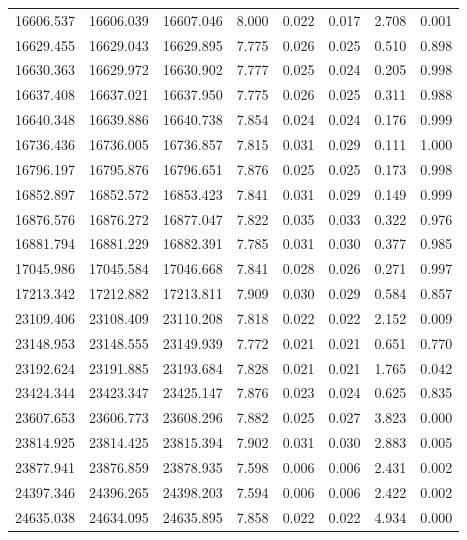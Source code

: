 \begin{table}
\begin{tabular}{cccccccc}
16606.537 & 16606.039 & 16607.046 & 8.000 & 0.022 & 0.017 & 2.708 & 0.001 \\
16629.455 & 16629.043 & 16629.895 & 7.775 & 0.026 & 0.025 & 0.510 & 0.898 \\
16630.363 & 16629.972 & 16630.902 & 7.777 & 0.025 & 0.024 & 0.205 & 0.998 \\
16637.408 & 16637.021 & 16637.950 & 7.775 & 0.026 & 0.025 & 0.311 & 0.988 \\
16640.348 & 16639.886 & 16640.738 & 7.854 & 0.024 & 0.024 & 0.176 & 0.999 \\
16736.436 & 16736.005 & 16736.857 & 7.815 & 0.031 & 0.029 & 0.111 & 1.000 \\
16796.197 & 16795.876 & 16796.651 & 7.876 & 0.025 & 0.025 & 0.173 & 0.998 \\
16852.897 & 16852.572 & 16853.423 & 7.841 & 0.031 & 0.029 & 0.149 & 0.999 \\
16876.576 & 16876.272 & 16877.047 & 7.822 & 0.035 & 0.033 & 0.322 & 0.976 \\
16881.794 & 16881.229 & 16882.391 & 7.785 & 0.031 & 0.030 & 0.377 & 0.985 \\
17045.986 & 17045.584 & 17046.668 & 7.841 & 0.028 & 0.026 & 0.271 & 0.997 \\
17213.342 & 17212.882 & 17213.811 & 7.909 & 0.030 & 0.029 & 0.584 & 0.857 \\
23109.406 & 23108.409 & 23110.208 & 7.818 & 0.022 & 0.022 & 2.152 & 0.009 \\
23148.953 & 23148.555 & 23149.939 & 7.772 & 0.021 & 0.021 & 0.651 & 0.770 \\
23192.624 & 23191.885 & 23193.684 & 7.828 & 0.021 & 0.021 & 1.765 & 0.042 \\
23424.344 & 23423.347 & 23425.147 & 7.876 & 0.023 & 0.024 & 0.625 & 0.835 \\
23607.653 & 23606.773 & 23608.296 & 7.882 & 0.025 & 0.027 & 3.823 & 0.000 \\
23814.925 & 23814.425 & 23815.394 & 7.902 & 0.031 & 0.030 & 2.883 & 0.005 \\
23877.941 & 23876.859 & 23878.935 & 7.598 & 0.006 & 0.006 & 2.431 & 0.002 \\
24397.346 & 24396.265 & 24398.203 & 7.594 & 0.006 & 0.006 & 2.422 & 0.002 \\
24635.038 & 24634.095 & 24635.895 & 7.858 & 0.022 & 0.022 & 4.934 & 0.000 \\
\bottomrule
\end{tabular}
\end{table}
